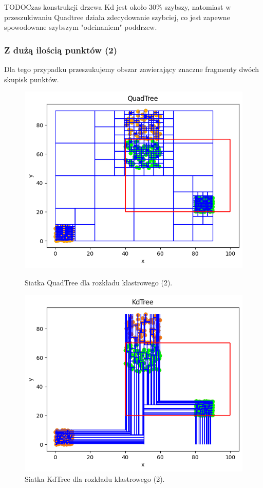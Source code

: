 \documentclass{lab}
\begin{document}
TODOCzas konstrukcji drzewa Kd jest około 30\% szybszy, natomiast w przeszukiwaniu Quadtree działa zdecydowanie szybciej, co jest zapewne spowodowane szybszym "odcinaniem" poddrzew.

\newpage
\subsubsection{Z dużą ilością punktów (2)}
Dla tego przypadku przeszukujemy obszar zawierający znaczne fragmenty dwóch skupisk punktów.

\begin{figure}[H]
  \centering
  \begin{minipage}{0.495\textwidth}
      \centering
      \includegraphics[width=1\textwidth]{resources/cluster_QuadTree_2.png}
      \caption{Siatka QuadTree dla rozkładu klastrowego (2).}
      \label{fig:cluster_QuadTree_2}
  \end{minipage}
  \begin{minipage}{0.495\textwidth}
      \centering
      \includegraphics[width=1\textwidth]{resources/cluster_KdTree_2.png}
      \caption{Siatka KdTree dla rozkładu klastrowego (2).}
      \label{fig:cluster_KdTree_2}
  \end{minipage}
\end{figure}
\end{document}
